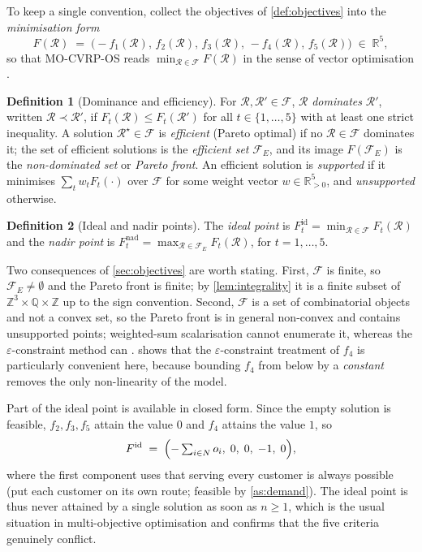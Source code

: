 \documentclass[11pt,a4paper]{article}
\theoremstyle{definition}
\newtheorem{definition}{Definition}[section]
\theoremstyle{plain}
\newcommand{\R}{\mathbb{R}}
\newcommand{\Z}{\mathbb{Z}}
\newcommand{\Feas}{\mathcal{F}}
\newcommand{\Routes}{\mathcal{R}}
\newcommand{\Cust}{N}
\begin{document}
To keep a single convention, collect the objectives of
\cref{def:objectives} into the \emph{minimisation form}
\begin{equation}
  F(\Routes) \;=\;
  \bigl( -f_1(\Routes),\, f_2(\Routes),\, f_3(\Routes),\, -f_4(\Routes),\,
         f_5(\Routes) \bigr) \;\in\; \R^5 ,
  \label{eq:objvec}
\end{equation}
so that \textup{\textsc{MO-CVRP-OS}} reads $\min_{\Routes \in \Feas} F(\Routes)$ in the
sense of vector optimisation \cite{Ehrgott2005}.

\begin{definition}[Dominance and efficiency]
\label{def:dominance}
For $\Routes, \Routes' \in \Feas$, $\Routes$ \emph{dominates} $\Routes'$,
written $\Routes \prec \Routes'$, if $F_t(\Routes) \le F_t(\Routes')$ for all
$t \in \{1,\dots,5\}$ with at least one strict inequality.  A solution
$\Routes^\star \in \Feas$ is \emph{efficient} (Pareto optimal) if no
$\Routes \in \Feas$ dominates it; the set of efficient solutions is the
\emph{efficient set} $\Feas_E$, and its image $F(\Feas_E)$ is the
\emph{non-dominated set} or \emph{Pareto front}.  An efficient solution is
\emph{supported} if it minimises $\sum_t w_t F_t(\cdot)$ over $\Feas$ for some
weight vector $w \in \R^5_{>0}$, and \emph{unsupported} otherwise.
\end{definition}

\begin{definition}[Ideal and nadir points]
The \emph{ideal point} is $F^{\mathrm{id}}_t = \min_{\Routes \in \Feas}
F_t(\Routes)$ and the \emph{nadir point} is $F^{\mathrm{nad}}_t =
\max_{\Routes \in \Feas_E} F_t(\Routes)$, for $t = 1,\dots,5$.
\end{definition}

Two consequences of \cref{sec:objectives} are worth stating.  First,
$\Feas$ is finite, so $\Feas_E \ne \emptyset$ and the Pareto front is finite;
by \cref{lem:integrality} it is a finite subset of
$\Z^3 \times \mathbb{Q} \times \Z$ up to the sign convention.  Second, $\Feas$
is a set of combinatorial objects and not a convex set, so the Pareto front is
in general non-convex and contains unsupported points; weighted-sum
scalarisation cannot enumerate it, whereas the $\varepsilon$-constraint method
can \cite{Ehrgott2005}.   shows that the
$\varepsilon$-constraint treatment of $f_4$ is particularly convenient here,
because bounding $f_4$ from below by a \emph{constant} removes the only
non-linearity of the model.

Part of the ideal point is available in closed form.  Since the empty solution
is feasible, $f_2, f_3, f_5$ attain the value $0$ and $f_4$ attains the value
$1$, so
\begin{equation}
  F^{\mathrm{id}} \;=\;
  \Bigl( -\textstyle\sum_{i \in \Cust} o_i,\; 0,\; 0,\; -1,\; 0 \Bigr),
\end{equation}
where the first component uses that serving every customer is always possible
(put each customer on its own route; feasible by \cref{as:demand}).  The ideal
point is thus never attained by a single solution as soon as $n \ge 1$, which
is the usual situation in multi-objective optimisation and confirms that the
five criteria genuinely conflict.
\end{document}
